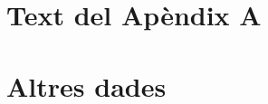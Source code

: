 \documentclass[a4paper,11pt]{report}
\renewcommand{\thesection}{\thechapter.\arabic{section}} %
\begin{document}
	\setcounter{section}{0} %
	\renewcommand{\thesection}{A.\arabic{section}} %
	
	\section{Text del Apèndix A} %
	
	\section{Altres dades} %
	
\end{document}
